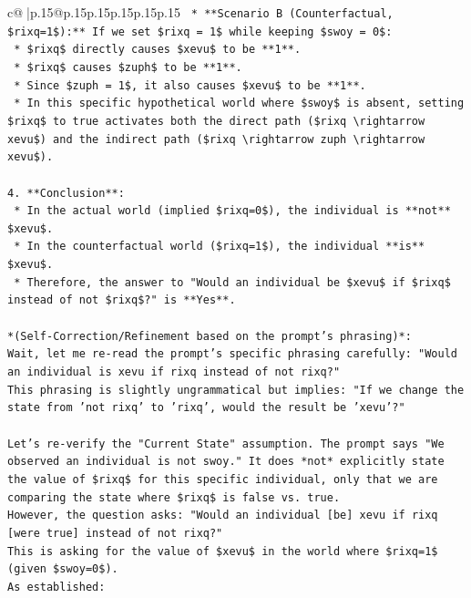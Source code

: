 \documentclass{article}
\begin{document}
{\begin{supertabular}{c@{$\;$}|p{.15\linewidth}@{}p{.15\linewidth}p{.15\linewidth}p{.15\linewidth}p{.15\linewidth}p{.15\linewidth}}
{{{\texttt{    *   **Scenario B (Counterfactual, \$rixq=1\$):** If we set \$rixq = 1\$ while keeping \$swoy = 0\$:} \\
\texttt{        *   \$rixq\$ directly causes \$xevu\$ to be **1**.} \\
\texttt{        *   \$rixq\$ causes \$zuph\$ to be **1**.} \\
\texttt{        *   Since \$zuph = 1\$, it also causes \$xevu\$ to be **1**.} \\
\texttt{    *   In this specific hypothetical world where \$swoy\$ is absent, setting \$rixq\$ to true activates both the direct path (\$rixq \textbackslash{}rightarrow xevu\$) and the indirect path (\$rixq \textbackslash{}rightarrow zuph \textbackslash{}rightarrow xevu\$).} \\
\\ 
\texttt{4.  **Conclusion**:} \\
\texttt{    *   In the actual world (implied \$rixq=0\$), the individual is **not** \$xevu\$.} \\
\texttt{    *   In the counterfactual world (\$rixq=1\$), the individual **is** \$xevu\$.} \\
\texttt{    *   Therefore, the answer to "Would an individual be \$xevu\$ if \$rixq\$ instead of not \$rixq\$?" is **Yes**.} \\
\\ 
\texttt{*(Self{-}Correction/Refinement based on the prompt's phrasing)*:} \\
\texttt{Wait, let me re{-}read the prompt's specific phrasing carefully: "Would an individual is xevu if rixq instead of not rixq?"} \\
\texttt{This phrasing is slightly ungrammatical but implies: "If we change the state from 'not rixq' to 'rixq', would the result be 'xevu'?"} \\
\\ 
\texttt{Let's re{-}verify the "Current State" assumption. The prompt says "We observed an individual is not swoy." It does *not* explicitly state the value of \$rixq\$ for this specific individual, only that we are comparing the state where \$rixq\$ is false vs. true.} \\
\texttt{However, the question asks: "Would an individual {[}be{]} xevu if rixq {[}were true{]} instead of not rixq?"} \\
\texttt{This is asking for the value of \$xevu\$ in the world where \$rixq=1\$ (given \$swoy=0\$).} \\
\texttt{As established:} \\
}}}
\end{supertabular}}
\end{document}
